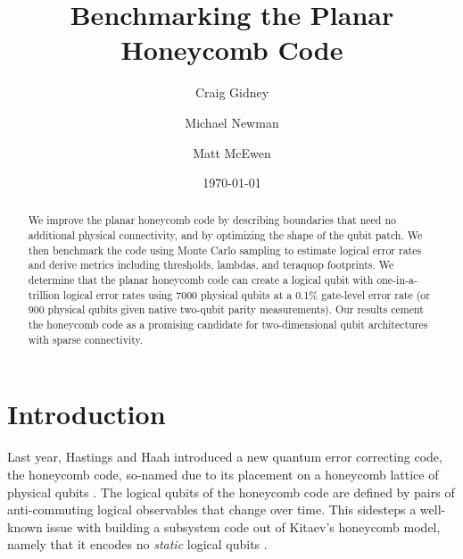 \documentclass[onecolumn,unpublished,a4paper]{quantumarticle}
\theoremstyle{definition}
\theoremstyle{definition}
\theoremstyle{definition}
\begin{document}
\title{Benchmarking the Planar Honeycomb Code}

\date{\today}
\author{Craig Gidney}

\author{Michael Newman}

\author{Matt McEwen}

\begin{abstract}
We improve the planar honeycomb code by describing boundaries that need no additional physical connectivity, and by optimizing the shape of the qubit patch.
We then benchmark the code using Monte Carlo sampling to estimate logical error rates and derive metrics including thresholds, lambdas, and teraquop footprints.
We determine that the planar honeycomb code can create a logical qubit with one-in-a-trillion logical error rates using 7000 physical qubits at a 0.1\% gate-level error rate (or 900 physical qubits given native two-qubit parity measurements).
Our results cement the honeycomb code as a promising candidate for two-dimensional qubit architectures with sparse connectivity.
\end{abstract}

\maketitle

\section{Introduction}
\label{sec:introduction}

Last year, Hastings and Haah introduced a new quantum error correcting code, the honeycomb code, so-named due to its placement on a honeycomb lattice of physical qubits \cite{hastings2021dynamically}.
The logical qubits of the honeycomb code are defined by pairs of anti-commuting logical observables that change over time.  
This sidesteps a well-known issue with building a subsystem code out of Kitaev's honeycomb model, namely that it encodes no \emph{static} logical qubits \cite{kitaev2006anyons, suchara2011constructions, lee2017topological, wootton2021hexagonal}.
\end{document}
